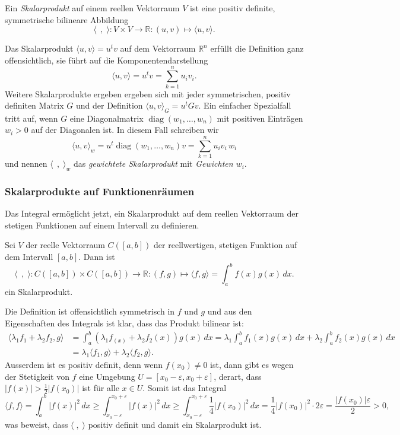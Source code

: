 \begin{definition}
Ein {\em Skalarprodukt} auf einem reellen Vektorraum $V$ ist eine
positiv definite, symmetrische bilineare Abbildung
\[
\langle\;\,,\;\rangle
\colon
V\times V
\to
\mathbb{R}
:
(u,v) \mapsto \langle u,v\rangle.
\]
\end{definition}

Das Skalarprodukt $\langle u,v\rangle=u^tv$ auf dem Vektorraum 
$\mathbb{R}^n$ erfüllt die Definition ganz offensichtlich,
sie führt auf die Komponentendarstellung
\[
\langle u,v\rangle = u^tv = \sum_{k=1}^n u_iv_i.
\]
Weitere Skalarprodukte ergeben ergeben sich mit jeder symmetrischen,
positiv definiten Matrix $G$ und der Definition
$\langle u,v\rangle_G=u^tGv$.
Ein einfacher Spezialfall tritt auf, wenn $G$ eine Diagonalmatrix
$\operatorname{diag}(w_1,\dots,w_n)$
mit positiven Einträgen $w_i>0$ auf der Diagonalen ist.
In diesem Fall schreiben wir
\[
\langle u,v\rangle_w
=
u^t\operatorname{diag}(w_1,\dots,w_n)v
=
\sum_{k=1}^n u_iv_i\,w_i
\]
und nennen $\langle \;\,,\;\rangle_w$ das {\em gewichtete Skalarprodukt}
mit {\em Gewichten $w_i$}.

\subsubsection{Skalarprodukte auf Funktionenräumen}
Das Integral ermöglicht jetzt, ein Skalarprodukt auf dem reellen
Vektorraum der stetigen Funktionen auf einem Intervall zu definieren.

\begin{definition}
Sei $V$ der reelle Vektorraum $C([a,b])$ der reellwertigen, stetigen
Funktion auf dem Intervall $[a,b]$.
Dann ist 
\[
\langle\;\,,\;\rangle
\colon
C([a,b]) \times C([a,b]) \to \mathbb{R}
:
(f,g) \mapsto \langle f,g\rangle = \int_a^b f(x)g(x)\,dx.
\]
ein Skalarprodukt.
\end{definition}

Die Definition ist offensichtlich symmetrisch in $f$ und $g$ und
aus den Eigenschaften des Integrals ist klar, dass das Produkt
bilinear ist:
\begin{align*}
\langle \lambda_1 f_1+\lambda_2f_2,g\rangle
&=
\int_a^b (\lambda_1f_(x) +\lambda_2f_2(x))g(x)\,dx
=
\lambda_1\int_a^b f_1(x) g(x)\,dx
+
\lambda_2\int_a^b f_2(x) g(x)\,dx
\\
&=
\lambda_1\langle f_1,g\rangle
+
\lambda_2\langle f_2,g\rangle.
\end{align*}
Ausserdem ist es positiv definit, denn wenn $f(x_0) \ne 0$ ist,
dann gibt es wegen der Stetigkeit von $f$ eine Umgebung
$U=[x_0-\varepsilon,x_0+\varepsilon]$, derart, dass $|f(x)| > \frac12|f(x_0)|$
ist für alle $x\in U$.
Somit ist das Integral
\[
\langle f,f\rangle
=
\int_a^b |f(x)|^2\,dx
\ge
\int_{x_0-\varepsilon}^{x_0+\varepsilon} |f(x)|^2\,dx
\ge
\int_{x_0-\varepsilon}^{x_0+\varepsilon} \frac14|f(x_0)|^2\,dx
=
\frac{1}{4}|f(x_0)|^2\cdot 2\varepsilon
=
\frac{|f(x_0)|\varepsilon}{2}
>0,
\]
was beweist, dass $\langle\;,\;\rangle$ positiv definit und damit
ein Skalarprodukt ist.

